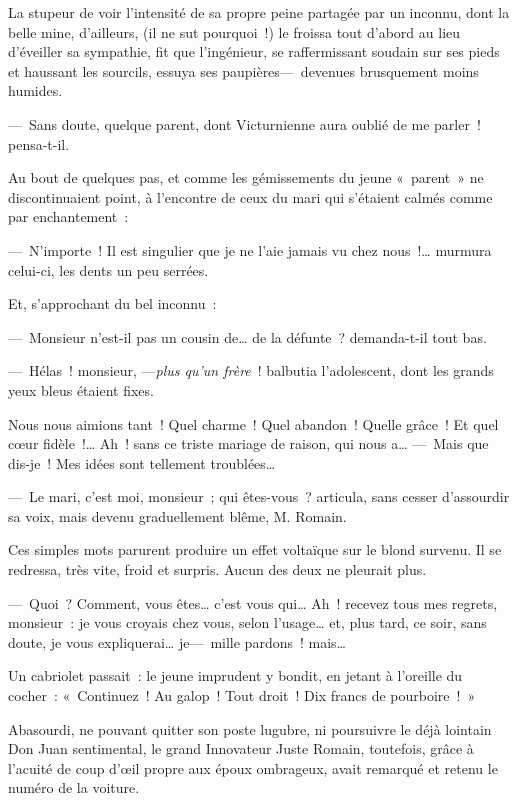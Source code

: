 \documentclass[french,twoside]{book} %
\begin{document}
La stupeur de voir l’intensité de sa propre   peine partagée par un inconnu, dont la belle mine, d’ailleurs, (il ne sut pourquoi !) le froissa tout d’abord au lieu d’éveiller sa sympathie, fit que l’ingénieur, se raffermissant soudain sur ses pieds et haussant les sourcils, essuya ses paupières— devenues brusquement moins humides.\par
— Sans doute, quelque parent, dont Victurnienne aura oublié de me parler ! pensa-t-il.\par
Au bout de quelques pas, et comme les gémissements du jeune « parent » ne discontinuaient point, à l’encontre de ceux du mari qui s’étaient calmés comme par enchantement :\par
— N’importe ! Il est singulier que je ne l’aie jamais vu chez nous !… murmura celui-ci, les dents un peu serrées.\par
Et, s’approchant du bel inconnu :\par
— Monsieur n’est-il pas un cousin de… de la défunte ? demanda-t-il tout bas.\par
— Hélas ! monsieur, —\emph{plus qu’un frère} ! balbutia l’adolescent, dont les grands yeux bleus étaient fixes.\par
   Nous nous aimions tant ! Quel charme ! Quel abandon ! Quelle grâce ! Et quel cœur fidèle !… Ah ! sans ce triste mariage de raison, qui nous a… — Mais que dis-je ! Mes idées sont tellement troublées…\par
— Le mari, c’est moi, monsieur ; qui êtes-vous ? articula, sans cesser d’assourdir sa voix, mais devenu graduellement blême, M. Romain.\par
Ces simples mots parurent produire un effet voltaïque sur le blond survenu. Il se redressa, très vite, froid et surpris. Aucun des deux ne pleurait plus.\par
— Quoi ? Comment, vous êtes… c’est vous qui… Ah ! recevez tous mes regrets, monsieur : je vous croyais chez vous, selon l’usage… et, plus tard, ce soir, sans doute, je vous expliquerai… je— mille pardons ! mais…\par
Un cabriolet passait : le jeune imprudent y bondit, en jetant à l’oreille du cocher : « Continuez ! Au galop ! Tout droit ! Dix francs de pourboire ! »\par
Abasourdi, ne pouvant quitter son poste lugubre, ni poursuivre le déjà lointain Don Juan   sentimental, le grand Innovateur Juste Romain, toutefois, grâce à l’acuité de coup d’œil propre aux époux ombrageux, avait remarqué et retenu le numéro de la voiture.\par
\end{document}
